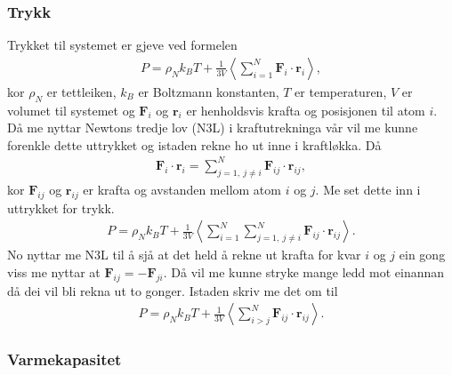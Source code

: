 \documentclass[12pt, a4paper]{article}
\theoremstyle{definition}
\newcommand{\vb}{\mathbf}
\begin{document}
        \subsubsection*{Trykk}
            Trykket til systemet er gjeve ved formelen 
            \begin{align*}
                P = \rho_Nk_BT + \frac{1}{3V}\left \langle \sum_{i = 1}^N \vb{F}_{i}\cdot\vb{r}_{i} \right \rangle,
            \end{align*}
            kor $\rho_N$ er tettleiken, $k_B$ er Boltzmann konstanten, $T$ er temperaturen, $V$ er volumet til systemet og $\vb{F}_i$ og $\vb{r}_i$ er henholdsvis krafta
            og posisjonen til atom $i$. Då me nyttar Newtons tredje lov (N3L) i kraftutrekninga vår vil me kunne forenkle dette uttrykket og istaden rekne ho ut inne i kraftløkka.
            Då 
            \begin{align*}
                \vb{F}_i\cdot\vb{r}_i = \sum_{j = 1, \ j \neq i}^{N}\vb{F}_{ij}\cdot\vb{r}_{ij},
            \end{align*}
            kor $\vb{F}_{ij}$ og $\vb{r}_{ij}$ er krafta og avstanden mellom atom $i$ og $j$. Me set dette inn i uttrykket for trykk.
            \begin{align*}
                P = \rho_Nk_BT + \frac{1}{3V}\left \langle \sum_{i = 1}^N \sum_{j = 1, \ j \neq i}^{N}\vb{F}_{ij}\cdot\vb{r}_{ij} \right \rangle.
            \end{align*}
            No nyttar me N3L til å sjå at det held å rekne ut krafta for kvar $i$ og $j$ ein gong viss me nyttar at $\vb{F}_{ij} = -\vb{F}_{ji}$. Då vil me kunne stryke
            mange ledd mot einannan då dei vil bli rekna ut to gonger. Istaden skriv me det om til
            \begin{align*}
                P = \rho_Nk_BT + \frac{1}{3V}\left \langle \sum_{i > j}^N \vb{F}_{ij}\cdot\vb{r}_{ij} \right \rangle.
            \end{align*}


        \subsubsection*{Varmekapasitet}
\end{document}
